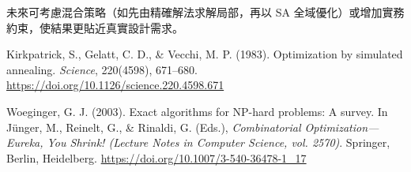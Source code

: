 \documentclass[conference]{IEEEtran}
\begin{document}
未來可考慮混合策略（如先由精確解法求解局部，再以 SA 全域優化）或增加實務約束，使結果更貼近真實設計需求。

\FloatBarrier %

\begin{thebibliography}{99}
 Kirkpatrick, S., Gelatt, C. D., \& Vecchi, M. P. (1983). Optimization by simulated annealing. \textit{Science}, 220(4598), 671–680. \url{https://doi.org/10.1126/science.220.4598.671}

 Woeginger, G. J. (2003). Exact algorithms for NP-hard problems: A survey. In Jünger, M., Reinelt, G., \& Rinaldi, G. (Eds.), \textit{Combinatorial Optimization—Eureka, You Shrink! (Lecture Notes in Computer Science, vol. 2570)}. Springer, Berlin, Heidelberg. \url{https://doi.org/10.1007/3-540-36478-1_17}
\end{thebibliography}
\end{document}
